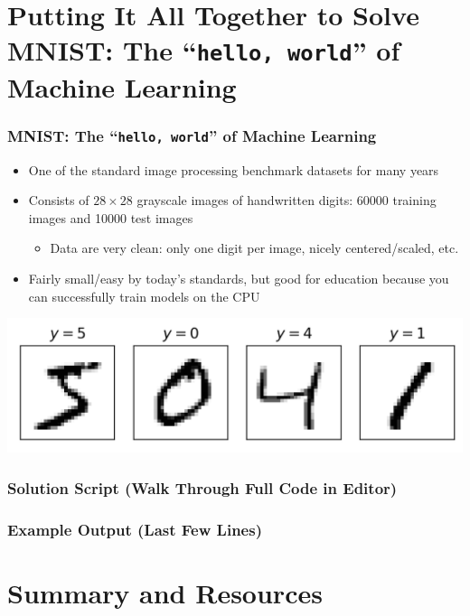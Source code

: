 \documentclass[xcolor={x11names,table}]{beamer}
\begin{document}
\section{Putting It All Together to Solve MNIST: The ``\texttt{hello, world}'' of Machine Learning}

\begin{frame}
	\frametitle{MNIST: The ``\texttt{hello, world}'' of Machine Learning}
	\begin{itemize}
		\item One of the standard image processing benchmark datasets for many years
		\item Consists of $28\times 28$ grayscale images of handwritten digits: \num{60000} training images and \num{10000} test images
		\begin{itemize}
			\item Data are very clean: only one digit per image, nicely centered/scaled, etc.
		\end{itemize}
		\item Fairly small/easy by today's standards, but good for education because you can successfully train models on the CPU
	\end{itemize}
	\begin{center}
		\includegraphics[width=\textwidth]{mnist}
	\end{center}
\end{frame}

\begin{frame}
	\frametitle{Solution Script (Walk Through Full Code in Editor)}
	\vspace{-0.5\baselineskip}
	{
		\scriptsize
		
	}
\end{frame}

\begin{frame}
	\frametitle{Example Output (Last Few Lines)}
	
\end{frame}

\section{Summary and Resources}
\end{document}
